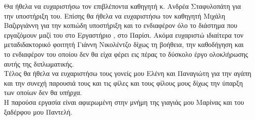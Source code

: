 \begin{acknowledgements}
Θα ήθελα να ευχαριστήσω τον επιβλέποντα καθηγητή κ. Ανδρέα Σταφυλοπάτη για την υποστήριξη του.
Επίσης θα ήθελα να ευχαριστήσω τον καθηγητή Μιχάλη Βαζιργιάννη για την κοπιώδη υποστήριξη και το ενδιαφέρον όλο το διάστημα που εργαζόμουν μαζί του στο Εργαστήριο , στο Παρίσι. 
Ακόμα ευχαριστώ ιδιαίτερα τον μεταδιδακτορικό φοιτητή Γιάννη Νικολέντζο δίχως τη βοήθεια, την καθοδήγηση και το ενδιαφέρον του οποίου δεν θα είχα φέρει εις πέρας το δύσκολο έργο ολοκλήρωσης αυτής της διπλωματικής.\\
Τέλος θα ήθελα να ευχαριστήσω τους γονείς μου Ελένη και Παναγιώτη για την αγάπη και την συνεχή παρουσιά τους και τις φίλες και τους φίλους μους δίχως την ύπαρξη των οποίων δεν θα υπήρχα.\\
Η παρούσα εργασία είναι αφιερωμένη στην μνήμη της γιαγιάς μου Μαρίνας και του ξαδέρφου μου Παντελή.
\end{acknowledgements}

